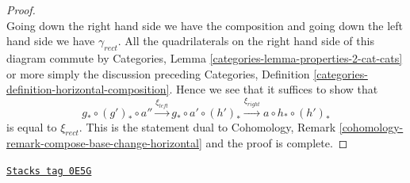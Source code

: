\begin{proof}
$$$$
Going down the right hand side we have the composition and going
down the left hand side we have $\gamma_{rect}$.
All the quadrilaterals on the right hand side of this diagram commute
by Categories, Lemma \ref{categories-lemma-properties-2-cat-cats}
or more simply the discussion preceding
Categories, Definition \ref{categories-definition-horizontal-composition}.
Hence we see that it suffices to show that
$$
g_* \circ (g')_* \circ a'' \xrightarrow{\xi_{left}}
g_* \circ a' \circ (h')_* \xrightarrow{\xi_{right}}
a \circ h_* \circ (h')_*
$$
is equal to $\xi_{rect}$. This is the statement dual to
Cohomology, Remark \ref{cohomology-remark-compose-base-change-horizontal}
and the proof is complete.
\end{proof}

\begin{remark}
\label{spaces-duality-remark-going-around}
\href{https://stacks.math.columbia.edu/tag/0E5G}{\texttt{Stacks tag 0E5G}}


\end{remark}
